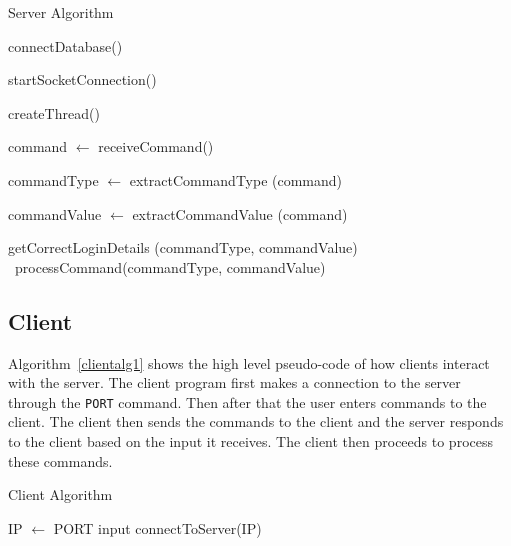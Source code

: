 \documentclass[journal, a4paper]{IEEEtran}
\begin{document}
	\begin{algorithm}
	\caption{Server Algorithm}\label{serveralg1}
	\begin{algorithmic}[1]
		
		connectDatabase()
		
		startSocketConnection()
		
		 {
		\EndWhile
		
	
		createThread()
		
		command $\gets$ receiveCommand()
		
		commandType $\gets$ extractCommandType (command)
		
		commandValue $\gets$ extractCommandValue (command)
		
			getCorrectLoginDetails (commandType, commandValue)
		\Else~processCommand(commandType, commandValue)
		\EndIf
		
		}
		 
		\EndProcedure
	\end{algorithmic}
\end{algorithm}






\subsection{Client}
Algorithm~\ref{clientalg1} shows the high level pseudo-code of how clients interact with the server. The client program first makes a connection to the server through the \texttt{PORT} command. Then after that the user enters commands to the client. The client then sends the commands to the client and the server responds to the client based  on the input it receives. The client then proceeds to process these commands. 
\begin{algorithm}
	\caption{Client Algorithm}\label{clientalg1}
	\begin{algorithmic}[1]
		IP $\gets$ PORT input
		connectToServer(IP)
		\EndProcedure
	\end{algorithmic}
\end{algorithm}
\end{document}
